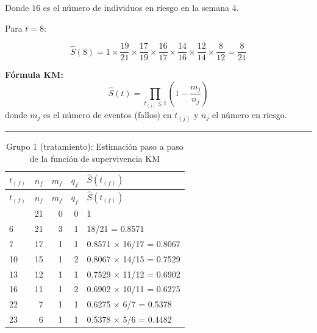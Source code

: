 \documentclass[
]{article}
\begin{document}
\begin{tcolorbox}
Donde \(16\) es el número de individuos en riesgo en la semana 4.

Para \(t = 8\):

\[
\hat{S}(8) = 1 \times \frac{19}{21} \times \frac{17}{19} \times \frac{16}{17} \times \frac{14}{16} \times \frac{12}{14} \times \frac{8}{12} = \frac{8}{21}
\]

\end{tcolorbox}

\textbf{Fórmula KM:}\\
\[
\hat{S}(t) = \prod_{t_{(j)} \le t} \left( 1 - \frac{m_j}{n_j} \right)
\] donde \(m_j\) es el número de eventos (fallos) en \(t_{(j)}\) y
\(n_j\) el número en riesgo.

\begin{center}\rule{0.5\linewidth}{0.5pt}\end{center}

\begin{longtable}[]{@{}lrrrl@{}}
\caption{Grupo 1 (tratamiento): Estimación paso a paso de la función de
supervivencia KM}\tabularnewline
\toprule\noalign{}
\(t_{(f)}\) & \(n_f\) & \(m_f\) & \(q_f\) & \(\hat{S}(t_{(f)})\) \\
\midrule\noalign{}
\endfirsthead
\toprule\noalign{}
\(t_{(f)}\) & \(n_f\) & \(m_f\) & \(q_f\) & \(\hat{S}(t_{(f)})\) \\
\midrule\noalign{}
\endhead
\bottomrule\noalign{}
\endlastfoot
0 & 21 & 0 & 0 & 1 \\
6 & 21 & 3 & 1 & 18/21 = 0.8571 \\
7 & 17 & 1 & 1 & 0.8571 × 16/17 = 0.8067 \\
10 & 15 & 1 & 2 & 0.8067 × 14/15 = 0.7529 \\
13 & 12 & 1 & 1 & 0.7529 × 11/12 = 0.6902 \\
16 & 11 & 1 & 2 & 0.6902 × 10/11 = 0.6275 \\
22 & 7 & 1 & 1 & 0.6275 × 6/7 = 0.5378 \\
23 & 6 & 1 & 1 & 0.5378 × 5/6 = 0.4482 \\
\end{longtable}
\end{document}
